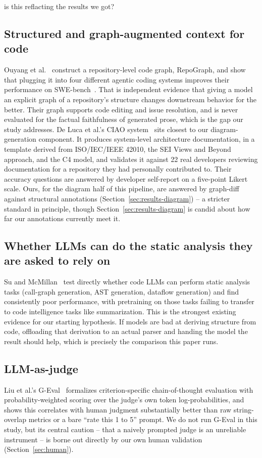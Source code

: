 is this reflacting the results we got?\documentclass[conference]{IEEEtran}
\begin{document}
\subsection{Structured and graph-augmented context for code}
Ouyang et al.~\cite{ouyang2024repograph} construct a repository-level code graph, RepoGraph, and
show that plugging it into four different agentic coding systems improves their performance on
SWE-bench~\cite{jimenez2024swebench}. That is independent evidence that giving a model an
explicit graph of a repository's structure changes downstream behavior for the better. Their
graph supports code editing and issue resolution, and is never evaluated for the factual
faithfulness of generated prose, which is the gap our study addresses. De Luca et al.'s CIAO
system~\cite{deluca2026ciao} sits closest to our diagram-generation component. It produces
system-level architecture documentation, in a template derived from ISO/IEC/IEEE 42010, the SEI
Views and Beyond approach, and the C4 model, and validates it against 22 real developers
reviewing documentation for a repository they had personally contributed to. Their accuracy
questions are answered by developer self-report on a five-point Likert scale. Ours, for the
diagram half of this pipeline, are answered by graph-diff against structural annotations
(Section~\ref{sec:results-diagram}) -- a stricter standard in principle, though
Section~\ref{sec:results-diagram} is candid about how far our annotations currently meet it.

\subsection{Whether LLMs can do the static analysis they are asked to rely on}
Su and McMillan~\cite{su2025docode} test directly whether code LLMs can perform static analysis
tasks (call-graph generation, AST generation, dataflow generation) and find consistently poor
performance, with pretraining on those tasks failing to transfer to code intelligence tasks
like summarization. This is the strongest existing evidence for our starting hypothesis. If
models are bad at deriving structure from code, offloading that derivation to an actual parser
and handing the model the result should help, which is precisely the comparison this paper runs.

\subsection{LLM-as-judge}
Liu et al.'s G-Eval~\cite{liu2023geval} formalizes criterion-specific chain-of-thought
evaluation with probability-weighted scoring over the judge's own token log-probabilities, and
shows this correlates with human judgment substantially better than raw string-overlap metrics
or a bare ``rate this 1 to 5'' prompt. We do not run G-Eval in this study, but its central
caution -- that a naively prompted judge is an unreliable instrument -- is borne out directly by
our own human validation (Section~\ref{sec:human}).
\end{document}
